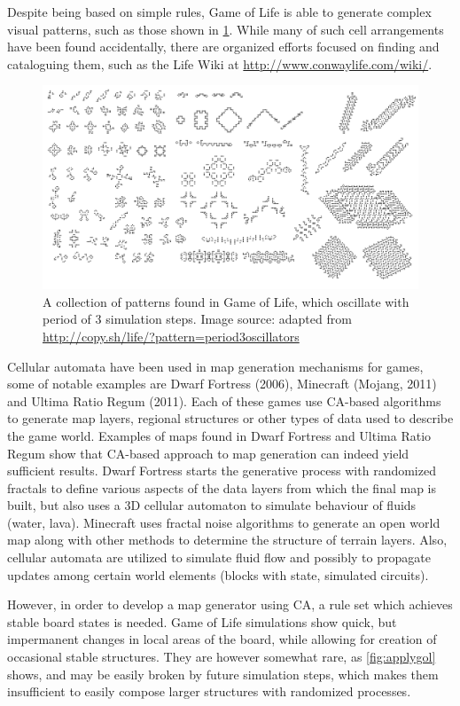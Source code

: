 \documentclass[12pt]{report}
\begin{document}
Despite being based on simple rules, Game of Life is able to generate complex visual patterns, such as those shown in \cref{fig:p3oscillators}. While many of such cell arrangements have been found accidentally, there are organized efforts focused on finding and cataloguing them, such as the Life Wiki at \url{http://www.conwaylife.com/wiki/}. 

\begin{figure}[H]
	\centering
	\includegraphics[width=0.9\linewidth]{images/p3oscillators}
	\caption{A collection of patterns found in Game of Life, which oscillate with period of 3 simulation steps. Image source: adapted from \url{http://copy.sh/life/?pattern=period3oscillators}}
	\label{fig:p3oscillators}
\end{figure}

Cellular automata have been used in map generation mechanisms for games, some of notable examples are Dwarf Fortress (2006),  Minecraft (Mojang, 2011) and Ultima Ratio Regum (2011). Each of these games use CA-based algorithms to generate map layers, regional structures or other types of data used to describe the game world. Examples of maps found in Dwarf Fortress and Ultima Ratio Regum show that CA-based approach to map generation can indeed yield sufficient results. Dwarf Fortress starts the generative process with randomized fractals \autocite{adams2015simulation} to define various aspects of the data layers from which the final map is built, but also uses a 3D cellular automaton to simulate behaviour of fluids (water, lava). Minecraft uses fractal noise algorithms to generate an open world map along with other methods to determine the structure of terrain layers. Also, cellular automata are utilized to simulate fluid flow and possibly to propagate updates among certain world elements (blocks with state, simulated circuits).

However, in order to develop a map generator using CA, a rule set which achieves stable board states is needed. Game of Life simulations show quick, but impermanent changes in local areas of the board, while allowing for creation of occasional stable structures. They are however somewhat rare, as \ref{fig:applygol} shows, and may be easily broken by future simulation steps, which makes them insufficient to easily compose larger structures with randomized processes.
\end{document}
